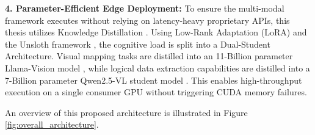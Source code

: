 \textbf{4. Parameter-Efficient Edge Deployment:}
To ensure the multi-modal framework executes without relying on latency-heavy proprietary APIs, this thesis utilizes Knowledge Distillation \citep{knowledge_distill}. Using Low-Rank Adaptation (LoRA) \citep{lora} and the Unsloth framework \citep{unsloth}, the cognitive load is split into a Dual-Student Architecture. Visual mapping tasks are distilled into an 11-Billion parameter Llama-Vision model \citep{llama3_vision}, while logical data extraction capabilities are distilled into a 7-Billion parameter Qwen2.5-VL student model \citep{qwen25_vl}. This enables high-throughput execution on a single consumer GPU without triggering CUDA memory failures.

An overview of this proposed architecture is illustrated in Figure \ref{fig:overall_architecture}.

